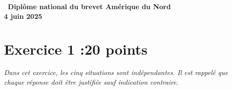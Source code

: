 \documentclass[11pt]{article}
\begin{document}

\hypertarget{AmeriqueduNord}{}
\label{AmeriqueduNord}
\pagestyle{fancy}
\thispagestyle{empty}
\begin{center} {\Large \textbf{\decofourleft~Diplôme national du brevet Amérique du Nord~\decofourright\\[7pt] 4 juin 2025}}
\end{center}

\section*{Exercice 1 :\hfill 20 points}

\emph{Dans cet exercice, les cinq situations sont indépendantes. Il est rappelé que chaque réponse doit être justifiée sauf indication contraire.}
\end{document}
